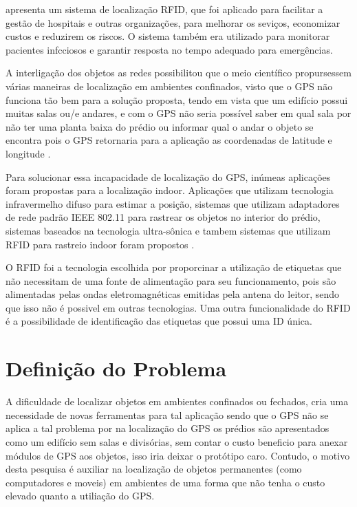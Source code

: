 apresenta um sistema de localização RFID, que foi aplicado para facilitar a gestão de hospitais e outras organizações, para melhorar os seviços, economizar custos e reduzirem os riscos. O sistema também era utilizado para monitorar pacientes infcciosos e garantir resposta no tempo adequado para emergências.


A interligação dos objetos as redes possibilitou que o meio científico propursessem várias maneiras de localização em ambientes 
confinados, visto que o GPS não funciona tão bem para a solução proposta, tendo em vista que um edifício possui muitas salas ou/e andares, e com o GPS não seria possível saber em qual sala por não ter uma planta baixa do prédio ou informar qual o andar o objeto se encontra pois o GPS retornaria para a aplicação as coordenadas de latitude e longitude \cite{rfid2009review}.


Para solucionar essa incapacidade de localização do GPS, inúmeas aplicações foram propostas para a localização indoor.  Aplicações que utilizam tecnologia infravermelho difuso para estimar a posição, sistemas que utilizam adaptadores de rede padrão IEEE 802.11 para rastrear os objetos no interior do prédio, sistemas baseados na tecnologia ultra-sônica e tambem sistemas que utilizam RFID para rastreio indoor foram propostos \cite{mechanismRFID2006}. 


O RFID foi a tecnologia escolhida por proporcinar a utilização de etiquetas que não necessitam de uma fonte de alimentação para seu funcionamento, pois são alimentadas pelas ondas eletromagnéticas emitidas pela antena do leitor, sendo que isso não é possivel em outras tecnologias. Uma outra funcionalidade do RFID é a possibilidade de identificação das etiquetas que possui uma ID única.



\section{Definição do Problema}
A dificuldade de localizar objetos em ambientes confinados ou fechados, cria uma necessidade de novas ferramentas para 
tal aplicação sendo que o GPS não se aplica a tal problema por na localização do GPS os prédios são apresentados como um edifício sem salas e divisórias, sem contar o custo beneficio para anexar módulos de GPS aos objetos, isso iria deixar o protótipo caro. Contudo, o motivo desta pesquisa é auxiliar na localização de objetos permanentes (como computadores e moveis) 
em ambientes de uma forma que não tenha o custo elevado quanto a utiliação do GPS\cite{mechanismRFID2006}.

